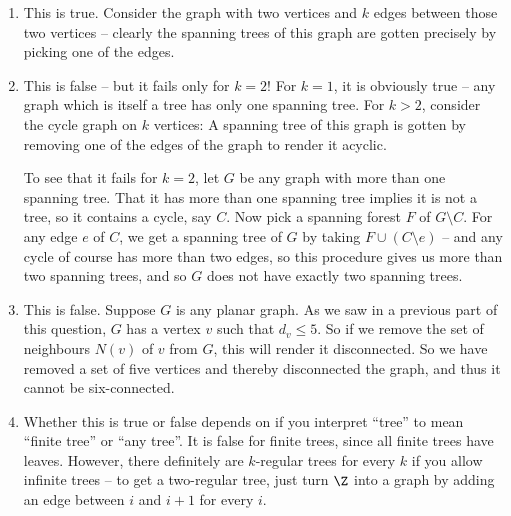 \documentclass[nobib]{tufte-handout}
\begin{document}
\begin{enumerate}[label=\alph*)]
    \item This is true. Consider the graph with two vertices and $k$ edges between those two vertices -- clearly the spanning trees of this graph are gotten precisely by picking one of the edges.
    
    \item This is false -- but it fails only for $k = 2$! For $k = 1$, it is obviously true -- any graph which is itself a tree has only one spanning tree. For $k > 2$, consider the cycle graph on $k$ vertices: A spanning tree of this graph is gotten by removing one of the edges of the graph to render it acyclic.
    
    To see that it fails for $k = 2$, let $G$ be any graph with more than one spanning tree. That it has more than one spanning tree implies it is not a tree, so it contains a cycle, say $C$. Now pick a spanning forest $F$ of $G \setminus C$. For any edge $e$ of $C$, we get a spanning tree of $G$ by taking $F \cup (C \setminus e)$ -- and any cycle of course has more than two edges, so this procedure gives us more than two spanning trees, and so $G$ does not have exactly two spanning trees.

    \item This is false. Suppose $G$ is any planar graph. As we saw in a previous part of this question, $G$ has a vertex $v$ such that $d_v \leq 5$. So if we remove the set of neighbours $N(v)$ of $v$ from $G$, this will render it disconnected. So we have removed a set of five vertices and thereby disconnected the graph, and thus it cannot be six-connected.
    
    \item Whether this is true or false depends on if you interpret ``tree'' to mean ``finite tree'' or ``any tree''. It is false for finite trees, since all finite trees have leaves. However, there definitely are $k$-regular trees for every $k$ if you allow infinite trees -- to get a two-regular tree, just turn $\Z$ into a graph by adding an edge between $i$ and $i+1$ for every $i$. 
\end{enumerate}
\end{document}
